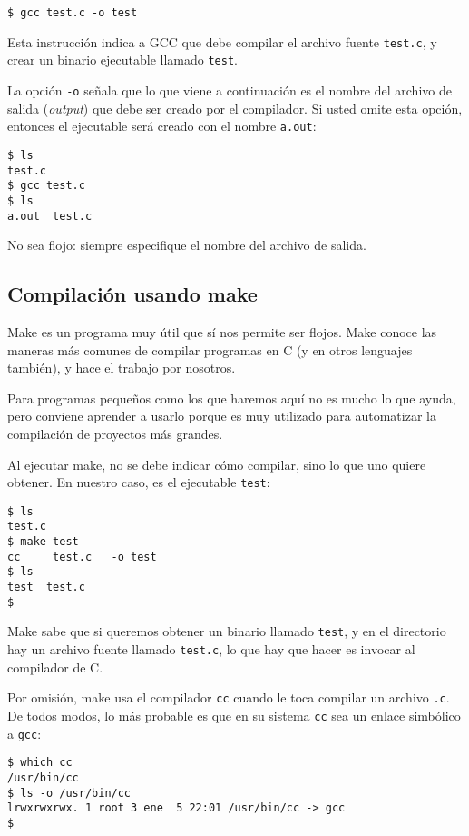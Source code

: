 \begin{lstlisting}
$ gcc test.c -o test
\end{lstlisting}

Esta instrucción indica a GCC que debe compilar el archivo fuente
\lstinline!test.c!, y crear un binario ejecutable llamado
\lstinline!test!.

La opción \lstinline!-o! señala que lo que viene a continuación es el
nombre del archivo de salida (\emph{output}) que debe ser creado por el
compilador. Si usted omite esta opción, entonces el ejecutable será
creado con el nombre \lstinline!a.out!:

\begin{lstlisting}
$ ls
test.c
$ gcc test.c
$ ls
a.out  test.c
\end{lstlisting}

No sea flojo: siempre especifique el nombre del archivo de salida.

\subsection{Compilación usando make}

Make es un programa muy útil que sí nos permite ser flojos. Make conoce
las maneras más comunes de compilar programas en C (y en otros lenguajes
también), y hace el trabajo por nosotros.

Para programas pequeños como los que haremos aquí no es mucho lo que
ayuda, pero conviene aprender a usarlo porque es muy utilizado para
automatizar la compilación de proyectos más grandes.

Al ejecutar make, no se debe indicar cómo compilar, sino lo que uno
quiere obtener. En nuestro caso, es el ejecutable \lstinline!test!:

\begin{lstlisting}
$ ls
test.c
$ make test
cc     test.c   -o test
$ ls
test  test.c
$
\end{lstlisting}

Make sabe que si queremos obtener un binario llamado \lstinline!test!, y
en el directorio hay un archivo fuente llamado \lstinline!test.c!, lo
que hay que hacer es invocar al compilador de C.

Por omisión, make usa el compilador \lstinline!cc! cuando le toca
compilar un archivo \lstinline!.c!. De todos modos, lo más probable es
que en su sistema \lstinline!cc! sea un enlace simbólico a
\lstinline!gcc!:

\begin{lstlisting}
$ which cc
/usr/bin/cc
$ ls -o /usr/bin/cc
lrwxrwxrwx. 1 root 3 ene  5 22:01 /usr/bin/cc -> gcc
$
\end{lstlisting}


